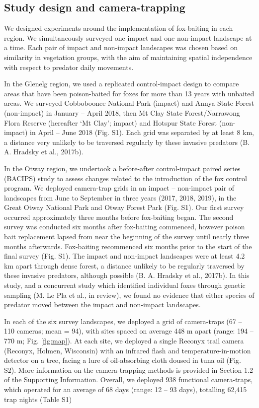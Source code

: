 \documentclass[]{elsarticle} %
\begin{document}
\hypertarget{study-design-and-camera-trapping}{%
\subsection{Study design and camera-trapping}\label{study-design-and-camera-trapping}}

We designed experiments around the implementation of fox-baiting in each region. We simultaneously surveyed one impact and one non-impact landscape at a time. Each pair of impact and non-impact landscapes was chosen based on similarity in vegetation groups, with the aim of maintaining spatial independence with respect to predator daily movements.

In the Glenelg region, we used a replicated control-impact design to compare areas that have been poison-baited for foxes for more than 13 years with unbaited areas. We surveyed Cobboboonee National Park (impact) and Annya State Forest (non-impact) in January -- April 2018, then Mt Clay State Forest/Narrawong Flora Reserve (hereafter `Mt Clay'; impact) and Hotspur State Forest (non-impact) in April -- June 2018 (Fig. S1). Each grid was separated by at least 8 km, a distance very unlikely to be traversed regularly by these invasive predators (B. A. Hradsky et al., 2017b).

In the Otway region, we undertook a before-after control-impact paired series (BACIPS) study to assess changes related to the introduction of the fox control program. We deployed camera-trap grids in an impact -- non-impact pair of landscapes from June to September in three years (2017, 2018, 2019), in the Great Otway National Park and Otway Forest Park (Fig. S1). Our first survey occurred approximately three months before fox-baiting began. The second survey was conducted six months after fox-baiting commenced, however poison bait replacement lapsed from near the beginning of the survey until nearly three months afterwards. Fox-baiting recommenced six months prior to the start of the final survey (Fig. S1). The impact and non-impact landscapes were at least 4.2 km apart through dense forest, a distance unlikely to be regularly traversed by these invasive predators, although possible (B. A. Hradsky et al., 2017b). In this study, and a concurrent study which identified individual foxes through genetic sampling (M. Le Pla et al., in review), we found no evidence that either species of predator moved between the impact and non-impact landscapes.

In each of the six survey landscapes, we deployed a grid of camera-traps (67 -- 110 cameras; mean = 94), with sites spaced on average 448 m apart (range: 194 -- 770 m; Fig. \ref{fig:map}). At each site, we deployed a single Reconyx trail camera (Reconyx, Holmen, Wisconsin) with an infrared flash and temperature-in-motion detector on a tree, facing a lure of oil-absorbing cloth doused in tuna oil (Fig. S2). More information on the camera-trapping methods is provided in Section 1.2 of the Supporting Information. Overall, we deployed 938 functional camera-traps, which operated for an average of 68 days (range: 12 -- 93 days), totalling 62,415 trap nights (Table S1)
\end{document}
